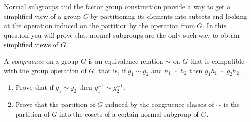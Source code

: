 \documentclass[oneside,10pt]{amsart}
\begin{document}
Normal subgroups and the factor group construction provide a way to get a simplified view of a group $G$ by partitioning its elements into subsets and looking at the operation induced on the partition by the operation from $G$. In this question you will prove that normal subgroups are the only such way to obtain simplified views of $G$.

A \emph{congruence} on a group $G$ is an equivalence relation $\sim$ on $G$ that is compatible with the group operation of $G$, that is, if $g_1 \sim g_2$ and $h_1 \sim h_2$ then $g_1h_1 \sim g_2h_2$.
\begin{enumerate}[label=(\alph*)]
\item
Prove that if $g_1 \sim g_2$ then $g_1^{-1} \sim g_2^{-1}$.
\item
Prove that the partition of $G$ induced by the congruence classes of $\sim$ is the partition of $G$ into the cosets of a certain normal subgroup of $G$.
\end{enumerate}
\end{document}
